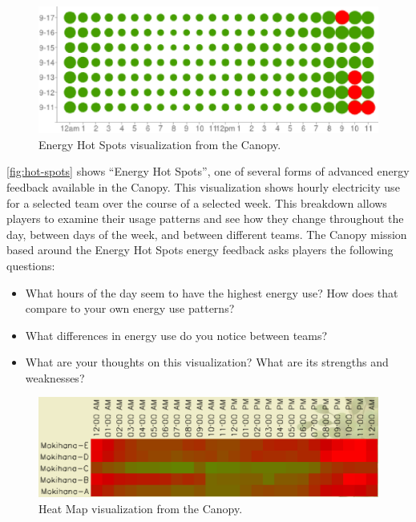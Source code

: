 \documentclass[10pt, conference, compsocconf]{IEEEtran-old}
\begin{document}
\begin{figure}[!tb]
	\centering
	\includegraphics[width=\columnwidth]{hot-spots-crop2.eps}
	\caption{Energy Hot Spots visualization from the Canopy.}
	\label{fig:hot-spots}
\end{figure}

\autoref{fig:hot-spots} shows ``Energy Hot Spots'', one of several forms of advanced energy feedback available in the Canopy. This visualization shows hourly electricity use for a selected team over the course of a selected week. This breakdown allows players to examine their usage patterns and see how they change throughout the day, between days of the week, and between different teams. The Canopy mission based around the Energy Hot Spots energy feedback asks players the following questions:

\begin{itemize}
	\item What hours of the day seem to have the highest energy use? How does that compare to your own energy use patterns?
	\item What differences in energy use do you notice between teams?
	\item What are your thoughts on this visualization? What are its strengths and weaknesses?
\end{itemize}

\begin{figure}[!tb]
	\centering
	\includegraphics[width=\columnwidth]{heat-map.eps}
	\caption{Heat Map visualization from the Canopy.}
	\label{fig:heat-map}
\end{figure}
\end{document}
